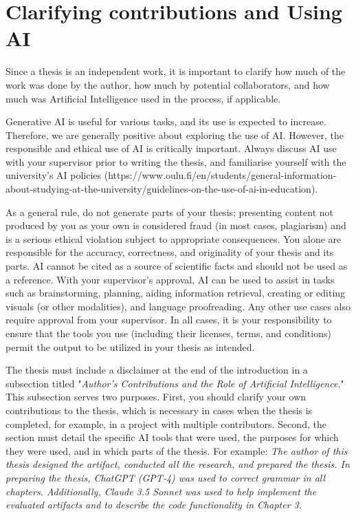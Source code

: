 \section{Clarifying contributions and Using AI}
\label{AI}
Since a thesis is an independent work, it is important to clarify how
much of the work was done by the author, how much by potential
collaborators, and how much was Artificial Intelligence used in the
process, if applicable.

Generative AI is useful for various tasks, and its use is expected to
increase. Therefore, we are generally positive about exploring the
use of AI. However, the responsible and ethical use of AI is
critically important. Always discuss AI use with your supervisor
prior to writing the thesis, and familiarise yourself with the
university's AI policies
(https://www.oulu.fi/en/students/general-information-about-studying-at-the-university/guidelines-on-the-use-of-ai-in-education).

As a general rule, do not generate parts of your thesis; presenting
content not produced by you as your own is considered fraud (in most
cases, plagiarism) and is a serious ethical violation subject to
appropriate consequences. You alone are responsible for the accuracy,
correctness, and originality of your thesis and its parts. AI cannot
be cited as a source of scientific facts and should not be used as a
reference. With your supervisor's approval, AI can be used to assist
in tasks such as brainstorming, planning, aiding information
retrieval, creating or editing visuals (or other modalities), and
language proofreading. Any other use cases also require approval from
your supervisor. In all cases, it is your responsibility to ensure
that the tools you use (including their licenses, terms, and
conditions) permit the output to be utilized in your thesis as intended.

The thesis must include a disclaimer at the end of the introduction
in a subsection titled "\textit{Author's Contributions and the Role
of Artificial Intelligence}." This subsection serves two purposes.
First, you should clarify your own contributions to the thesis, which
is necessary in cases when the thesis is completed, for example, in a
project with multiple contributors. Second, the section must detail
the specific AI tools that were used, the purposes for which they
were used, and in which parts of the thesis. For example: \textit{The
  author of this thesis designed the artifact, conducted all the
  research, and prepared the thesis. In preparing the thesis, ChatGPT
  (GPT-4) was used to correct grammar in all chapters. Additionally,
  Claude 3.5 Sonnet was used to help implement the evaluated artifacts
and to describe the code functionality in Chapter 3.}

